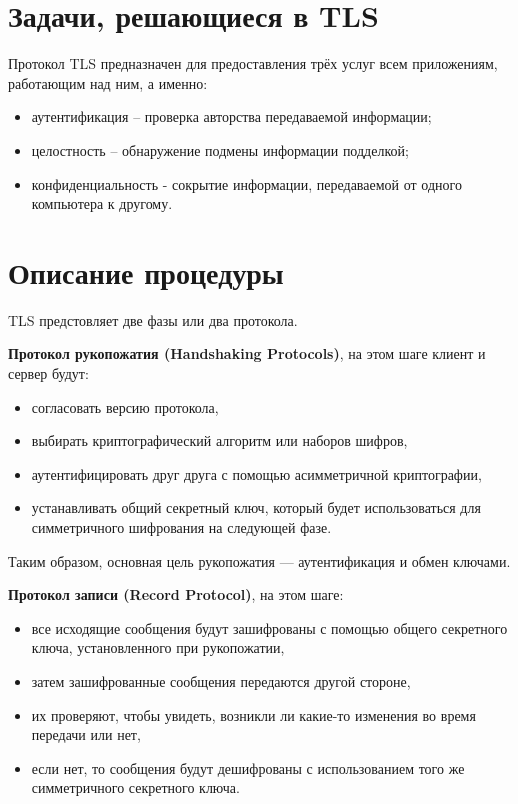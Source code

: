     \section{Задачи, решающиеся в TLS}
    
    Протокол TLS предназначен для предоставления трёх услуг всем приложениям, работающим над ним, а именно:
    
    \begin{itemize}
    	\item аутентификация – проверка авторства передаваемой информации; 
    	\item целостность – обнаружение подмены информации подделкой;
    	\item конфиденциальность - сокрытие информации, передаваемой от одного компьютера к другому.
    \end{itemize}    
        
        
    \section{Описание процедуры}

	TLS предстовляет две фазы или два протокола.
	
	\textbf{Протокол рукопожатия (Handshaking Protocols)}, на этом шаге клиент и сервер будут:
	
	\begin{itemize}
		\item согласовать версию протокола,
		\item выбирать криптографический алгоритм или наборов шифров,
		\item аутентифицировать друг друга с помощью асимметричной криптографии,
		\item устанавливать общий секретный ключ, который будет использоваться для симметричного шифрования на следующей фазе.
	\end{itemize}
    
    Таким образом, основная цель рукопожатия — аутентификация и обмен ключами.
    
    
    \textbf{Протокол записи (Record Protocol)}, на этом шаге:
    
    \begin{itemize}
    	\item все исходящие сообщения будут зашифрованы с помощью общего секретного ключа, установленного при рукопожатии,
    	\item затем зашифрованные сообщения передаются другой стороне,
    	\item их проверяют, чтобы увидеть, возникли ли какие-то изменения во время передачи или нет,
    	\item если нет, то сообщения будут дешифрованы с использованием того же симметричного секретного ключа.
    \end{itemize}
        
